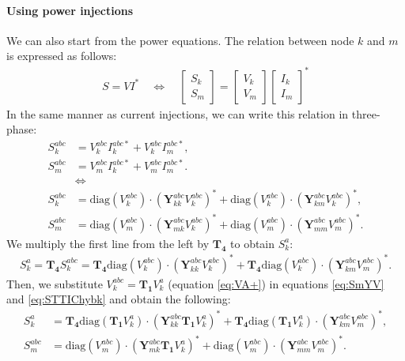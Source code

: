 \documentclass[10pt,journal]{article}
\begin{document}
\paragraph{Using power injections}
We can also start from the power equations. The relation between node $k$ and $m$ is expressed as follows: 
\begin{align}
   {S}={V}{I^*}\quad\Leftrightarrow\quad\begin{bmatrix}
     S_{k} \\
     S_m
    \end{bmatrix} = \begin{bmatrix}
     V_k \\
     V_m
    \end{bmatrix}\begin{bmatrix}
    I_k \\
     I_m
    \end{bmatrix}^*
    \end{align}
In the same manner as current injections, we can write this relation in three-phase: 
\begin{align}
   {S}_k^{abc}&={V}_k^{abc}{I}_k^{abc*}+{V}_k^{abc}{I}_m^{abc*},\label{eq:SkYV}\\
   {S}_m^{abc}&={V}_m^{abc}{I}_k^{abc*}+{V}_m^{abc}{I}_m^{abc*}.\label{eq:SmYV} \\
   & \Leftrightarrow \\ 
      {S}_k^{abc}&=\mbox{diag}({V}_k^{abc})\cdot (\mathbf{Y}^{abc}_{kk}{V}_k^{abc})^* +\mbox{diag}({V}_k^{abc})\cdot (\mathbf{Y}^{abc}_{km}{V}_k^{abc})^*,\label{eq:SkYV}\\
   {S}_m^{abc}&=\mbox{diag}({V}_m^{abc})\cdot (\mathbf{Y}^{abc}_{mk}{V}_k^{abc})^* +\mbox{diag}({V}_m^{abc})\cdot (\mathbf{Y}^{abc}_{mm}{V}_m^{abc})^*.\label{eq:SmYV} 
\end{align}
We multiply the first line from the left by $\mathbf{T_4}$ to obtain $S^a_k$: 
\begin{align}
    S_k^a =\mathbf{T_4} S^{abc}_k= \mathbf{T_4} \mbox{diag}({V}_k^{abc})\cdot (\mathbf{Y}^{abc}_{kk}{V}_k^{abc})^* + \mathbf{T_4}\mbox{diag}({V}_k^{abc})\cdot (\mathbf{Y}^{abc}_{km}{V}_m^{abc})^*. \label{eq:STTIChybk}
    \end{align} 
Then, we substitute $V_k^{abc}=\mathbf{T_1}V^a_k$ (equation  \eqref{eq:VA+}) in equations \eqref{eq:SmYV} and \eqref{eq:STTIChybk} and obtain the following:
\begin{align}
    S_k^a &= \mathbf{T_4}\mbox{diag}(\mathbf{T_1}V_k^a)\cdot (\mathbf{Y}_{kk}^{abc}\mathbf{T_1}V_k^a)^* + \mathbf{T_4}\mbox{diag}(\mathbf{T_1}V_k^a)\cdot (\mathbf{Y}_{km}^{abc}V_m^{abc})^*, \label{eq:STIChybk1}\\ 
        S^{abc}_m &=\mbox{diag}(V_m^{abc})\cdot (\mathbf{Y}_{mk}^{abc}\mathbf{T_1}V_k^a)^* + \mbox{diag}(V_m^{abc})\cdot( \mathbf{Y}_{mm}^{abc}V_m^{abc})^*. \label{eq:STIChybm1}
\end{align}
\end{document}
